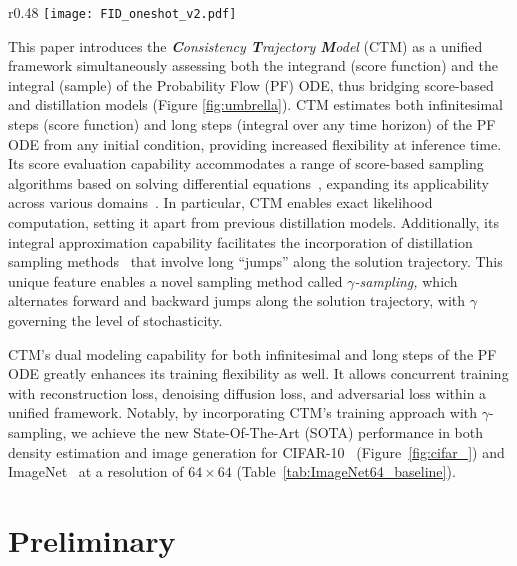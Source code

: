 \documentclass{article} \usepackage{iclr2024_coNFErence,times}
\theoremstyle{definition}
\theoremstyle{remark}
\begin{document}
\begin{wrapfigure}{r}{0.48\textwidth}
	\vskip -0.2in
	\centering
		\centering		\texttt{[image: FID\_oneshot\_v2.pdf]}
        \vskip -0.1in
 \caption{SOTA on CIFAR-10. Closeness to the origin indicates better performance.}
	\label{fig:cifar_}
 \vskip -0.1in
\end{wrapfigure}
This paper introduces the \emph{\textbf{C}onsistency \textbf{T}rajectory \textbf{M}odel} (CTM) as a unified framework simultaneously assessing both the integrand (score function) and the integral (sample) of the Probability Flow (PF) ODE, thus bridging score-based and distillation models (Figure \ref{fig:umbrella}). CTM estimates both infinitesimal steps (score function) and long steps (integral over any time horizon) of the PF ODE from any initial condition, providing increased  flexibility at inference time. Its score evaluation capability accommodates a range of score-based sampling algorithms based on  solving differential equations~\citep{song2020score}, expanding its applicability across various domains~\citep{saharia2022palette}. In particular, CTM enables exact likelihood computation, setting it apart from previous distillation models. 
Additionally, its integral approximation capability facilitates the incorporation of distillation sampling methods~\citep{salimans2021progressive,song2023consistency} that involve long ``jumps'' along the solution trajectory. This unique feature enables a novel sampling method called \emph{$\gamma$-sampling,} which alternates forward and backward jumps along the solution trajectory, with $\gamma$ governing the level of stochasticity.


CTM's dual modeling capability for both infinitesimal and long steps of the PF ODE greatly enhances its training flexibility as well. It allows concurrent training with reconstruction loss, denoising diffusion loss, and adversarial loss within a unified framework. Notably, by incorporating CTM's training approach with $\gamma$-sampling, we achieve the new State-Of-The-Art (SOTA) performance in both density estimation and image generation for CIFAR-10~\citep{krizhevsky2009learning} (Figure~\ref{fig:cifar_}) and ImageNet~\citep{russakovsky2015imagenet} at a resolution of $64\times64$ (Table~\ref{tab:ImageNet64_baseline}).


\section{Preliminary}\label{sec:preliminary}
\end{document}
